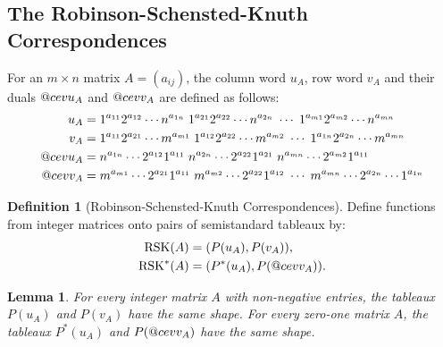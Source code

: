 \documentclass[11pt]{amsproc}
\makeatletter
\DeclareRobustCommand{\cev}[1]{%
  \mathpalette\do@cev{#1}%
}
\newcommand{\do@cev}[2]{%
  \fix@cev{#1}{+}%
  \reflectbox{$\m@th#1\vec{\reflectbox{$\fix@cev{#1}{-}\m@th#1#2\fix@cev{#1}{+}$}}$}%
  \fix@cev{#1}{-}%
}
\newcommand{\fix@cev}[2]{%
  \ifx#1\displaystyle
    \mkern#23mu
  \else
    \ifx#1\textstyle
      \mkern#23mu
    \else
      \ifx#1\scriptstyle
        \mkern#22mu
      \else
        \mkern#22mu
      \fi
    \fi
  \fi
}
\newtheorem{lemma}[theorem]{Lemma}
\theoremstyle{definition}
\newtheorem{definition}[theorem]{Definition}
\theoremstyle{example}
\newcommand{\rsk}{\textup{RSK}}
\makeatother
\begin{document}
\subsection{The Robinson-Schensted-Knuth Correspondences}
\label{sec:rsk}
For an $m\times n$ matrix $A=(a_{ij})$, the column word $u_A$, row word $v_A$ and their duals $\cev u_A$ and $\cev v_A$ are defined as follows:
\begin{align*}
  u_A &= 1^{a_{11}}2^{a_{12}}\dotsb n^{a_{1n}} \; 1^{a_{21}} 2^{a_{22}} \dotsb n^{a_{2n}} \; \dotsb \; 1^{a_{m1}} 2^{a_{m2}} \dotsb n^{a_{mn}}\\
  v_A &= 1^{a_{11}}2^{a_{21}}\dotsb m^{a_{m1}} \; 1^{a_{12}} 2^{a_{22}} \dotsb m^{a_{m2}} \; \dotsb \; 1^{a_{1n}} 2^{a_{2n}} \dotsb m^{a_{mn}}\\
  \cev u_A &= n^{a_{1n}} \dotsb 2^{a_{12}}1^{a_{11}}\; n^{a_{2n}}\dotsb 2^{a_{22}}1^{a_{21}} \; n^{a_{mn}} \dotsb 2^{a_{m2}} 1^{a_{11}}\\
  \cev v _A &= m^{a_{m1}}\dotsb 2^{a_{21}}1^{a_{11}} \; m^{a_{m2}}\dotsb 2^{a_{22}} 1^{a_{12}} \; \dotsb \; m^{a_{mn}}\dotsb  2^{a_{2n}} \dotsb 1^{a_{1n}}
\end{align*}
\begin{definition}
  [Robinson-Schensted-Knuth Correspondences]
  Define functions from integer matrices onto pairs of semistandard tableaux by:
  \begin{align*}
    \rsk(A) & = (P(u_A), P(v_A)),\\
    \rsk^*(A) & = (P^*(u_A), P(\cev v_A)).
  \end{align*}
\end{definition}
\begin{lemma}
  \label{lemma:same_shape}
  For every integer matrix $A$ with non-negative entries, the tableaux $P(u_A)$ and $P(v_A)$ have the same shape.
  For every zero-one matrix $A$, the tableaux $P^*(u_A)$ and $P(\cev v_A)$ have the same shape.
\end{lemma}
\end{document}
